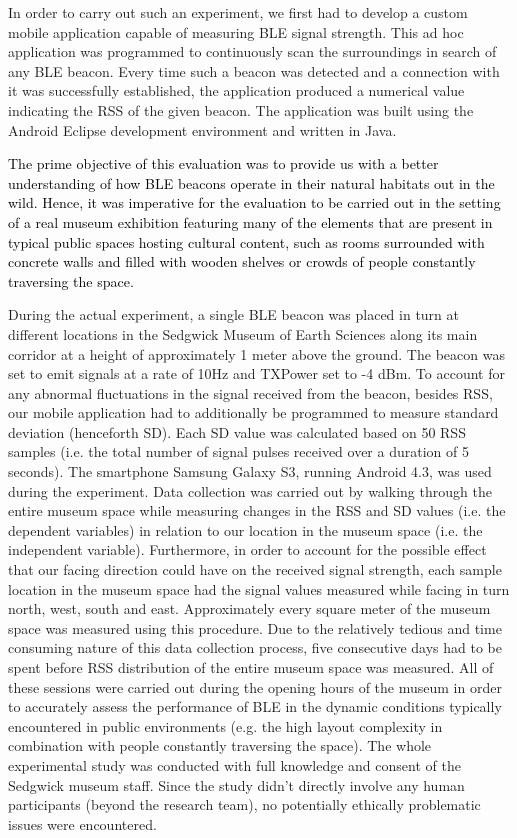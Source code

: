 \documentclass[prodmode,acmtomm]{acmsmall}
\begin{document}
In order to carry out such an experiment, we first had to develop a custom mobile application capable of measuring BLE signal strength. This ad hoc application was programmed to continuously scan the surroundings in search of any BLE beacon. Every time such a beacon was detected and a connection with it was successfully established, the application produced a numerical value indicating the RSS of the given beacon. The application was built using the Android Eclipse development environment and written in Java. 

\textcolor{black}{The prime objective of this evaluation was to provide us with a better understanding of how BLE beacons operate in their natural habitats out in the wild. Hence, it was imperative for the evaluation to be carried out in the setting of a real museum exhibition featuring many of the elements that are present in typical public spaces hosting cultural content, such as rooms surrounded with concrete walls and filled with wooden shelves or crowds of people constantly traversing the space. }

During the actual experiment, a single BLE beacon was placed in turn at different locations in the Sedgwick Museum of Earth Sciences along its main corridor at a height of approximately 1 meter above the ground. The beacon was set to emit signals at a rate of 10Hz and TXPower set to -4 dBm. To account for any abnormal fluctuations in the signal received from the beacon, besides RSS, our mobile application had to additionally be programmed to measure standard deviation (henceforth SD). Each SD value was calculated based on 50 RSS samples (i.e. the total number of signal pulses received over a duration of 5 seconds). The smartphone Samsung Galaxy S3, running Android 4.3, was used during the experiment. Data collection was carried out by walking through the entire museum space while measuring changes in the RSS and SD values (i.e. the dependent variables) in relation to our location in the museum space (i.e. the independent variable). Furthermore, in order to account for the possible effect that our facing direction could have on the received signal strength, each sample location in the museum space had the signal values measured while facing in turn north, west, south and east. Approximately every square meter of the museum space was measured using this procedure. Due to the relatively tedious and time consuming nature of this data collection process, five consecutive days had to be spent before RSS distribution of the entire museum space was measured. All of these sessions were carried out during the opening hours of the museum in order to accurately assess the performance of BLE in the dynamic conditions typically encountered in public environments (e.g. the high layout complexity in combination with people constantly traversing the space). The whole experimental study was conducted with full knowledge and consent of the Sedgwick museum staff. Since the study didn't directly involve any human participants (beyond the research team), no potentially ethically problematic issues were encountered.
\end{document}
